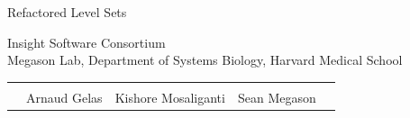 {
\color{white}
\begin{frame}[plain]
\fontsize{36pt}{36pt}\selectfont
\center
\begin{center}
Refactored Level Sets
\newline
\end{center}

\fontsize{12pt}{12pt}\selectfont
Insight Software Consortium\\
Megason Lab, Department of Systems Biology, Harvard Medical School
\newline
\begin{tabular}{cp{}p{}p{}c}
\\
\\
&
\centering{}Arnaud Gelas &
\centering{}Kishore Mosaliganti &
\centering{}Sean Megason & \\
\end{tabular}
\end{frame}
}



